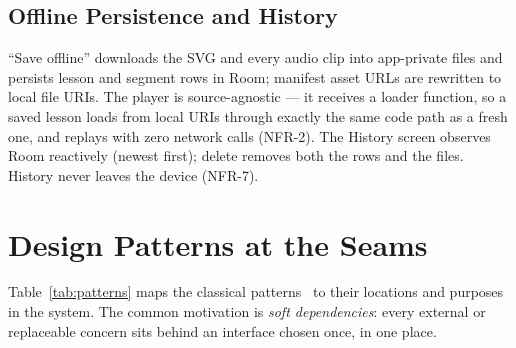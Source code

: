 \subsection{Offline Persistence and History}

``Save offline'' downloads the SVG and every audio clip into app-private
files and persists lesson and segment rows in Room; manifest asset URLs are
rewritten to local file URIs. The player is source-agnostic --- it receives a
loader function, so a saved lesson loads from local URIs through exactly the
same code path as a fresh one, and replays with zero network calls (NFR-2).
The History screen observes Room reactively (newest first); delete removes
both the rows and the files. History never leaves the device (NFR-7).

\section{Design Patterns at the Seams}
\label{sec:patterns}

Table~\ref{tab:patterns} maps the classical patterns~\cite{gamma1994} to
their locations and purposes in the system. The common motivation is
\emph{soft dependencies}: every external or replaceable concern sits behind
an interface chosen once, in one place.

